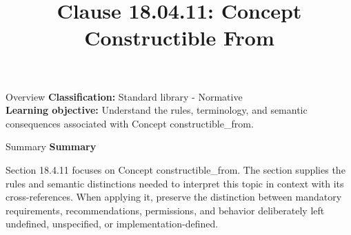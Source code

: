 \documentclass[10pt,letterpaper]{article}
\title{Clause 18.04.11: Concept Constructible From}
\author{}
\date{}
\begin{document}
\maketitle
\begin{CornellOverviewBox}{Overview}
\textbf{Classification:} Standard library - Normative\\[2pt]
\textbf{Learning objective:} Understand the rules, terminology, and semantic consequences associated with Concept constructible\_from.
\end{CornellOverviewBox}\begin{CornellSummaryBox}{Summary}
{\sffamily\bfseries\color{Accent} Summary}\par\vspace{3pt}Section 18.4.11 focuses on Concept constructible\_from. The section supplies the rules and semantic distinctions needed to interpret this topic in context with its cross-references. When applying it, preserve the distinction between mandatory requirements, recommendations, permissions, and behavior deliberately left undefined, unspecified, or implementation-defined.
\end{CornellSummaryBox}
\end{document}
